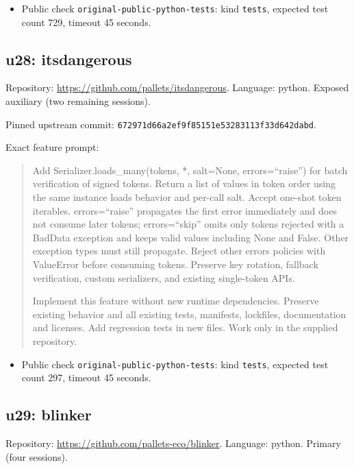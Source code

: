 \documentclass[manuscript,screen,nonacm]{acmart}
\providecommand{\tightlist}{\setlength{\itemsep}{0pt}\setlength{\parskip}{0pt}}
\begin{document}
\begin{itemize}
\tightlist
\item
  Public check \nolinkurl{original-public-python-tests}: kind
  \texttt{tests}, expected test count 729, timeout 45 seconds.
\end{itemize}

\subsection{u28: itsdangerous}\label{u28-itsdangerous}

Repository: \url{https://github.com/pallets/itsdangerous}. Language:
python. Exposed auxiliary (two remaining sessions).

Pinned upstream commit:
\nolinkurl{672971d66a2ef9f85151e53283113f33d642dabd}.

Exact feature prompt:

\begin{quote}
Add Serializer.loads\_many(tokens, *, salt=None, errors=``raise'') for
batch verification of signed tokens. Return a list of values in token
order using the same instance loads behavior and per-call salt. Accept
one-shot token iterables. errors=``raise'' propagates the first error
immediately and does not consume later tokens; errors=``skip'' omits
only tokens rejected with a BadData exception and keeps valid values
including None and False. Other exception types must still propagate.
Reject other errors policies with ValueError before consuming tokens.
Preserve key rotation, fallback verification, custom serializers, and
existing single-token APIs.

Implement this feature without new runtime dependencies. Preserve
existing behavior and all existing tests, manifests, lockfiles,
documentation and licenses. Add regression tests in new files. Work only
in the supplied repository.
\end{quote}

\begin{itemize}
\tightlist
\item
  Public check \nolinkurl{original-public-python-tests}: kind
  \texttt{tests}, expected test count 297, timeout 45 seconds.
\end{itemize}

\subsection{u29: blinker}\label{u29-blinker}

Repository: \url{https://github.com/pallets-eco/blinker}. Language:
python. Primary (four sessions).
\end{document}
